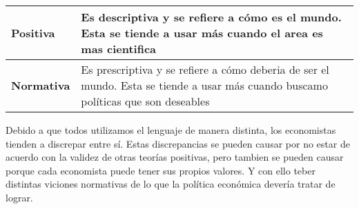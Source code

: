 \begingroup
\setlength{\tabcolsep}{5pt} %
\renewcommand{\arraystretch}{1.5} %
\begin{center}
\begin{tabular}{p{1.7cm}|p{11cm}}
{\bf Positiva}& Es descriptiva y se refiere a cómo es el mundo. Esta se tiende a usar más cuando el area es mas cientifica\\ \hline
{\bf Normativa}& Es prescriptiva y se refiere a cómo deberia de ser el mundo. Esta se tiende a usar más cuando buscamo políticas que son deseables
\end{tabular}
\end{center}
\endgroup

Debido a que todos utilizamos el lenguaje de manera distinta, los economistas tienden a discrepar entre sí. Estas discrepancias se pueden causar por no estar de acuerdo con la validez de otras teorías positivas, pero tambien se pueden causar porque cada economista puede tener sus propios valores. Y con ello teber distintas viciones normativas de lo que la política económica devería tratar de lograr.
